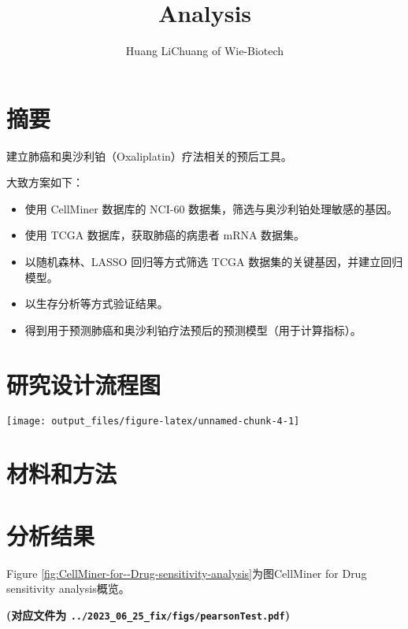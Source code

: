 \documentclass[
]{article}
\title{Analysis}
\author{Huang LiChuang of Wie-Biotech}
\date{}
\providecommand{\tightlist}{%
  \setlength{\itemsep}{0pt}\setlength{\parskip}{0pt}}
\begin{document}
\maketitle

{
\setcounter{tocdepth}{3}
\tableofcontents
}
\listoffigures

\listoftables

\hypertarget{abstract}{%
\section{摘要}\label{abstract}}

建立肺癌和奥沙利铂（Oxaliplatin）疗法相关的预后工具。

大致方案如下：

\begin{itemize}
\tightlist
\item
  使用 CellMiner 数据库的 NCI-60 数据集，筛选与奥沙利铂处理敏感的基因。
\item
  使用 TCGA 数据库，获取肺癌的病患者 mRNA 数据集。
\item
  以随机森林、LASSO 回归等方式筛选 TCGA 数据集的关键基因，并建立回归模型。
\item
  以生存分析等方式验证结果。
\item
  得到用于预测肺癌和奥沙利铂疗法预后的预测模型（用于计算指标）。
\end{itemize}

\hypertarget{route}{%
\section{研究设计流程图}\label{route}}

\texttt{[image: output\_files/figure-latex/unnamed-chunk-4-1]}

\hypertarget{methods}{%
\section{材料和方法}\label{methods}}

\hypertarget{results}{%
\section{分析结果}\label{results}}

Figure \ref{fig:CellMiner-for--Drug-sensitivity-analysis}为图CellMiner for Drug sensitivity analysis概览。

\textbf{(对应文件为 \texttt{../2023\_06\_25\_fix/figs/pearsonTest.pdf})}
\end{document}
